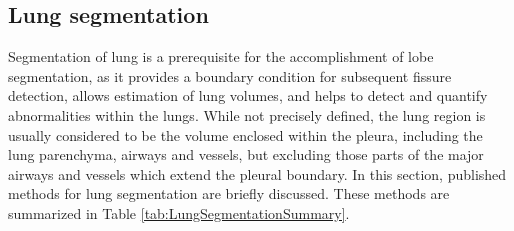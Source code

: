 \subsection{Lung segmentation}
Segmentation of lung is a prerequisite for the accomplishment of lobe segmentation, as it provides a boundary condition for subsequent fissure detection, allows estimation of lung volumes, and helps to detect and quantify abnormalities within the lungs. While not precisely defined, the lung region is usually considered to be the volume enclosed within the pleura, including the lung parenchyma, airways and vessels, but excluding those parts of the major airways and vessels which extend the pleural boundary. In this section, published methods for lung segmentation are briefly discussed. These methods are summarized in Table \ref{tab:LungSegmentationSummary}.

